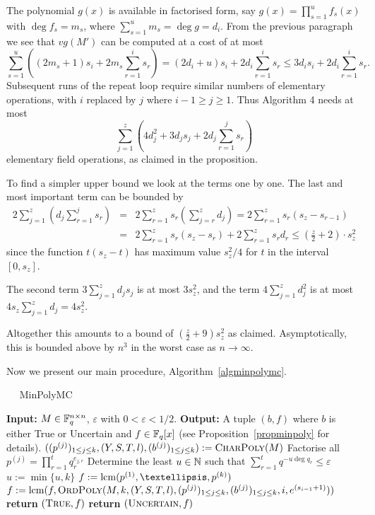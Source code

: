 The polynomial $g(x)$ is available in factorised form,
say $g(x)=\prod_{s=1}^uf_s(x)$ with $\deg f_s=m_s$,
where $\sum_{s=1}^um_s=\deg g=d_i$. From the previous
paragraph we see that $vg(M')$ can be computed at a cost of at most
\[
\sum_{s=1}^u\left((2m_s+1)s_i +2m_s\sum_{r=1}^i s_r \right)
=(2d_i+u)s_i+2d_i\sum_{r=1}^is_r \leq 3d_is_i+2d_i\sum_{r=1}^is_r.
\]
Subsequent runs of the repeat loop require similar numbers of elementary
operations, with $i$ replaced by $j$ where $i-1\geq j\geq 1$.
Thus Algorithm 4 needs at most
\[
\sum_{j=1}^z \left( 4d_j^2  + 3d_j s_j + 2d_j 
\sum_{r=1}^j s_r \right)
\]
elementary field operations, as claimed in the proposition.

To find a simpler upper bound we look at the terms one by one. The
last and most important term can be bounded by
\begin{eqnarray*}
  2\sum_{j=1}^z \left( d_j \sum_{r=1}^j s_r \right)
    &=& 2 \sum_{r=1}^z s_r \left(\sum_{j=r}^z d_j\right)
    = 2 \sum_{r=1}^z s_r (s_z - s_{r-1}) \\
    &=& 2 \sum_{r=1}^z s_r (s_z - s_r) + 2 \sum_{r=1}^z s_r d_r
    \le (\frac{z}{2}+2) \cdot s_z^2
\end{eqnarray*}
since the function $t(s_z-t)$ has maximum value $s_z^2/4$
for $t$ in the interval $[0,s_z]$.

The second term $3\sum_{j=1}^z d_j s_j$ is at most $3s_z^2$,
and the term
$4 \sum_{j=1}^z d_j^2$ is at most $4s_z\sum_{j=1}^z d_j = 4s_z^2$.

Altogether this amounts to a bound of $(\frac{z}{2}+9)s_z^2$ as claimed.
Asymptotically, this is bounded above by $n^3$ in the worst case as
$n \to \infty$.
\proofend

\smallskip
Now we present our main procedure, Algorithm~\ref{algminpolymc}. 

\begin{algorithm}
\caption{$\quad$ \sc MinPolyMC}
\label{algminpolymc}
\begin{algorithmic}
\STATE \textbf{Input:} $M \in \mathbb{F}_q^{n \times n}$, $\varepsilon$ with
$0 < \varepsilon < 1/2$.
\STATE \textbf{Output:} A tuple $(b,f)$ where $b$ is either {\sc True}
or {\sc Uncertain} and $f \in \mathbb{F}_q[x]$
\STATE \hspace*{0mm}  (see
Proposition~\ref{propminpoly} for details).
\vspace*{2mm}
\STATE
       $((p^{(j)})_{1 \le j \le k},(Y,S,T,l),(b^{(j)})_{1 \le j \le k})
       := \mbox{\sc CharPoly}(M)$
\STATE Factorise all $p^{(j)} = \prod_{r=1}^t q_r^{e_{j,r}}$ 
\STATE Determine the least $u \in \mathbb{N}$ such that
 $\sum_{r=1}^t q^{-u\deg q_r} \le \varepsilon$
\STATE $u := \min\{ u,k \}$
\STATE $f := \lcm(p^{(1)}, \ldots, p^{(k)})$ 
    \STATE $f := \mathrm{lcm}(f,\mbox{\sc OrdPoly}
           (M,k,(Y,S,T,l),(p^{(j)})_{1 \le j \le k}, 
           (b^{(j)})_{1 \le j \le k},i,e^{(s_{i-1}+1)}))$
\ENDFOR
{}
    \STATE \textbf{return} $(\mbox{\sc True},f)$
\ELSE
    \STATE \textbf{return} $(\mbox{\sc Uncertain},f)$
\ENDIF
\end{algorithmic}
\end{algorithm}

